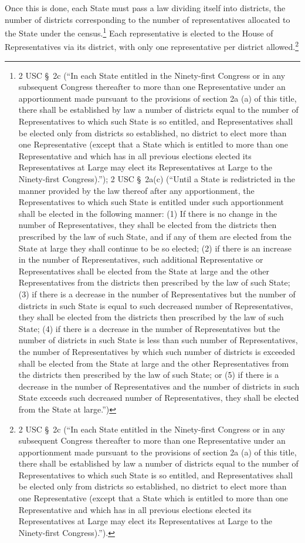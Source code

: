 Once this is done, each State must pass a law dividing itself into districts, the number of districts corresponding to the number of representatives allocated to the State under the census.\footnote{2 USC \S\ 2c (``In each State entitled in the Ninety-first Congress or in any subsequent Congress thereafter to more than one Representative under an apportionment made pursuant to the provisions of section 2a (a) of this title, there shall be established by law a number of districts equal to the number of Representatives to which such State is so entitled, and Representatives shall be elected only from districts so established, no district to elect more than one Representative (except that a State which is entitled to more than one Representative and which has in all previous elections elected its Representatives at Large may elect its Representatives at Large to the Ninety-first Congress).''); 2 USC \S\ 2a(c) (``Until a State is redistricted in the manner provided by the law thereof after any apportionment, the Representatives to which such State is entitled under such apportionment shall be elected in the following manner: (1) If there is no change in the number of Representatives, they shall be elected from the districts then prescribed by the law of such State, and if any of them are elected from the State at large they shall continue to be so elected; (2) if there is an increase in the number of Representatives, such additional Representative or Representatives shall be elected from the State at large and the other Representatives from the districts then prescribed by the law of such State; (3) if there is a decrease in the number of Representatives but the number of districts in such State is equal to such decreased number of Representatives, they shall be elected from the districts then prescribed by the law of such State; (4) if there is a decrease in the number of Representatives but the number of districts in such State is less than such number of Representatives, the number of Representatives by which such number of districts is exceeded shall be elected from the State at large and the other Representatives from the districts then prescribed by the law of such State; or (5) if there is a decrease in the number of Representatives and the number of districts in such State exceeds such decreased number of Representatives, they shall be elected from the State at large.'')}
Each representative is elected to the House of Representatives via its district, with only one representative per district allowed.\footnote{2 USC \S\ 2c (``In each State entitled in the Ninety-first Congress or in any subsequent Congress thereafter to more than one Representative under an apportionment made pursuant to the provisions of section 2a (a) of this title, there shall be established by law a number of districts equal to the number of Representatives to which such State is so entitled, and Representatives shall be elected only from districts so established, no district to elect more than one Representative (except that a State which is entitled to more than one Representative and which has in all previous elections elected its Representatives at Large may elect its Representatives at Large to the Ninety-first Congress).'').}
